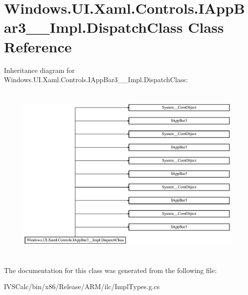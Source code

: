 \hypertarget{class_windows_1_1_u_i_1_1_xaml_1_1_controls_1_1_i_app_bar3_____impl_1_1_dispatch_class}{}\section{Windows.\+U\+I.\+Xaml.\+Controls.\+I\+App\+Bar3\+\_\+\+\_\+\+Impl.\+Dispatch\+Class Class Reference}
\label{class_windows_1_1_u_i_1_1_xaml_1_1_controls_1_1_i_app_bar3_____impl_1_1_dispatch_class}
Inheritance diagram for Windows.\+U\+I.\+Xaml.\+Controls.\+I\+App\+Bar3\+\_\+\+\_\+\+Impl.\+Dispatch\+Class\+:\begin{figure}[H]
\begin{center}
\leavevmode
\includegraphics[height=8.927536cm]{class_windows_1_1_u_i_1_1_xaml_1_1_controls_1_1_i_app_bar3_____impl_1_1_dispatch_class}
\end{center}
\end{figure}


The documentation for this class was generated from the following file\+:\begin{DoxyCompactItemize}
\item 
I\+V\+S\+Calc/bin/x86/\+Release/\+A\+R\+M/ilc/Impl\+Types.\+g.\+cs\end{DoxyCompactItemize}
